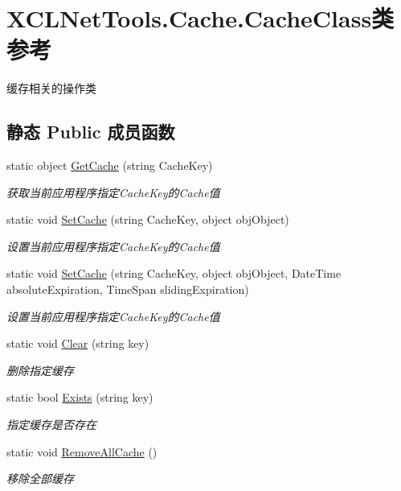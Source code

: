 \hypertarget{class_x_c_l_net_tools_1_1_cache_1_1_cache_class}{}\section{X\+C\+L\+Net\+Tools.\+Cache.\+Cache\+Class类 参考}
\label{class_x_c_l_net_tools_1_1_cache_1_1_cache_class}


缓存相关的操作类  


\subsection*{静态 Public 成员函数}
\begin{DoxyCompactItemize}
\item 
static object \hyperlink{class_x_c_l_net_tools_1_1_cache_1_1_cache_class_aa4eb429181d14c79040ea957bb4b8308}{Get\+Cache} (string Cache\+Key)
\begin{DoxyCompactList}\small\item\em 获取当前应用程序指定\+Cache\+Key的\+Cache值 \end{DoxyCompactList}\item 
static void \hyperlink{class_x_c_l_net_tools_1_1_cache_1_1_cache_class_a1f815a266c55067bab54e36c276ea82b}{Set\+Cache} (string Cache\+Key, object obj\+Object)
\begin{DoxyCompactList}\small\item\em 设置当前应用程序指定\+Cache\+Key的\+Cache值 \end{DoxyCompactList}\item 
static void \hyperlink{class_x_c_l_net_tools_1_1_cache_1_1_cache_class_a12454bcf0c4d79e76937bbd927df631e}{Set\+Cache} (string Cache\+Key, object obj\+Object, Date\+Time absolute\+Expiration, Time\+Span sliding\+Expiration)
\begin{DoxyCompactList}\small\item\em 设置当前应用程序指定\+Cache\+Key的\+Cache值 \end{DoxyCompactList}\item 
static void \hyperlink{class_x_c_l_net_tools_1_1_cache_1_1_cache_class_afeab3c01d1a7b41007235b97f3fbaa35}{Clear} (string key)
\begin{DoxyCompactList}\small\item\em 删除指定缓存 \end{DoxyCompactList}\item 
static bool \hyperlink{class_x_c_l_net_tools_1_1_cache_1_1_cache_class_aa7640102a9327d10ff130c69b724e27b}{Exists} (string key)
\begin{DoxyCompactList}\small\item\em 指定缓存是否存在 \end{DoxyCompactList}\item 
static void \hyperlink{class_x_c_l_net_tools_1_1_cache_1_1_cache_class_a36ade93bd935dbad5740285d48e2c5e6}{Remove\+All\+Cache} ()
\begin{DoxyCompactList}\small\item\em 移除全部缓存 \end{DoxyCompactList}\end{DoxyCompactItemize}


